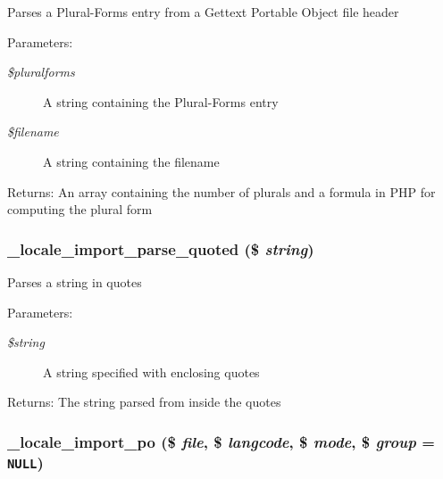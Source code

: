 Parses a Plural-Forms entry from a Gettext Portable Object file header

\begin{Desc}
\item[Parameters:]
\begin{description}
\item[{\em \$pluralforms}]A string containing the Plural-Forms entry \item[{\em \$filename}]A string containing the filename \end{description}
\end{Desc}
\begin{Desc}
\item[Returns:]An array containing the number of plurals and a formula in PHP for computing the plural form \end{Desc}
\hypertarget{group__locale_gac1954e79c57539b5599ff4ed7379df7}{
\subsubsection[{\_\-locale\_\-import\_\-parse\_\-quoted}]{\setlength{\rightskip}{0pt plus 5cm}\_\-locale\_\-import\_\-parse\_\-quoted (\$ {\em string})}}
\label{group__locale_gac1954e79c57539b5599ff4ed7379df7}


Parses a string in quotes

\begin{Desc}
\item[Parameters:]
\begin{description}
\item[{\em \$string}]A string specified with enclosing quotes \end{description}
\end{Desc}
\begin{Desc}
\item[Returns:]The string parsed from inside the quotes \end{Desc}
\hypertarget{group__locale_g5d3d163017bea9499839ef6be09807de}{
\subsubsection[{\_\-locale\_\-import\_\-po}]{\setlength{\rightskip}{0pt plus 5cm}\_\-locale\_\-import\_\-po (\$ {\em file}, \/  \$ {\em langcode}, \/  \$ {\em mode}, \/  \$ {\em group} = {\tt NULL})}}
\label{group__locale_g5d3d163017bea9499839ef6be09807de}


